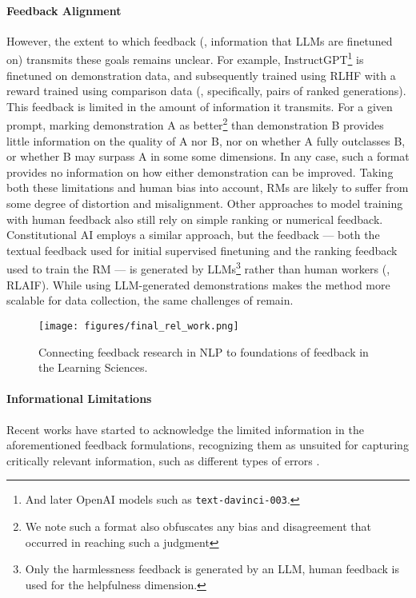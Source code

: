 \paragraph{Feedback Alignment} However, the extent to which feedback (\ie, information that LLMs are finetuned on) transmits these goals remains unclear.  
For example, InstructGPT\footnote{And later OpenAI models such as \texttt{text-davinci-003}.} \citep{ouyang2022instructGPT} is finetuned on demonstration data, and subsequently trained using RLHF with a reward trained using comparison data (\ie, specifically, pairs of ranked generations). 
This feedback is limited in the amount of information it transmits. For a given prompt, marking demonstration A as better\footnote{We note such a format also obfuscates any bias and disagreement that occurred in reaching such a judgment} than demonstration B provides little information on the quality of A nor B, nor on whether A fully outclasses B, or whether B may surpass A in some some dimensions. In any case, such a format provides no information on how either demonstration can be improved. Taking both these limitations and human bias into account, RMs are likely to suffer from some degree of distortion and misalignment. Other approaches \citep{liu2023chain, gao2022simulating} to model training with human feedback also still rely on simple ranking or numerical feedback.
%
Constitutional AI  \citep{bai_constitutional_2022} employs a similar approach, but the feedback --- both the textual feedback used for initial supervised finetuning and the ranking feedback used to train the RM --- is generated by LLMs\footnote{Only the harmlessness feedback is generated by an LLM, human feedback is used for the helpfulness dimension.} rather than human workers (\ie, RLAIF). While using LLM-generated demonstrations makes the method more scalable for data collection, the same challenges of remain. 

\begin{figure}[t]
\centering
\texttt{[image: figures/final\_rel\_work.png]}
\caption{Connecting feedback research in NLP to foundations of feedback in the Learning Sciences.}
\label{fig:base_framework}
\end{figure}

\paragraph{Informational Limitations} Recent works have started to acknowledge the limited information in the aforementioned feedback formulations, recognizing them as unsuited for capturing critically relevant information, such as different types of errors \citep{golovneva2023roscoe, wu2023finegrained}. 

